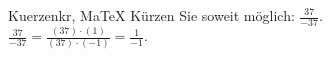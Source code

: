 \begin{MAufgabe}{Kuerzen}{kr, MaTeX}
K\"urzen Sie soweit m\"oglich: $\frac{37}{-37}$.\\ 
\ifLsg\MLoesung
\quad $\frac{37}{-37}=\frac{(37)\cdot(1)}{(37)\cdot(-1)}=\frac{1}{-1}$.\else\relax\fi
 \end{MAufgabe}